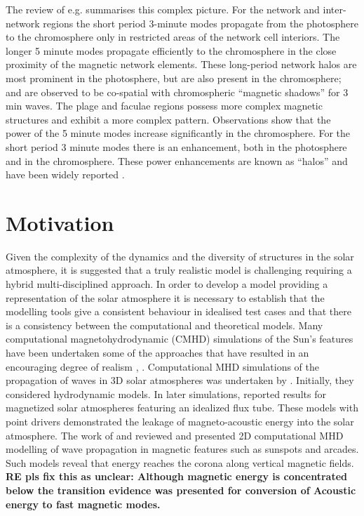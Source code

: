 \documentclass{aastex62}
\begin{document}

The review of e.g. \citet{Khomenko2013} summarises this complex picture. For the network and inter-network regions the short period 3-minute modes propagate from the photosphere to the chromosphere only in restricted areas of the network cell interiors. The longer 5 minute modes propagate efficiently to the chromosphere in the close proximity of the magnetic network elements. These long-period network halos are most prominent in the photosphere, but are also present in the chromosphere; and are observed to be co-spatial with chromospheric “magnetic shadows” for 3 min waves. The plage and faculae regions possess more complex magnetic structures and exhibit a more complex pattern.  Observations show that the power of the 5 minute modes increase significantly in the chromosphere. For the short period  3 minute modes there is an enhancement, both in the photosphere and in the chromosphere. These power enhancements are known as “halos” and have been widely reported \cite{Kontogiannis2010}. 

\section{Motivation} \label{sec:motivation}

Given the complexity of the dynamics and the diversity of structures in the solar atmosphere, it is suggested that a truly realistic model is challenging requiring a hybrid multi-disciplined approach. In order to develop a model providing a representation of the solar atmosphere it is necessary to establish that the modelling tools give a consistent behaviour in idealised test cases and that there is a consistency between the computational and theoretical models. Many computational magnetohydrodynamic (CMHD) simulations of the Sun's features  have been undertaken some of the approaches that have resulted in an encouraging degree of realism  \citet{Vogler2005}, \citet{Gudiksen2011}. Computational MHD simulations of the propagation of waves in 3D solar atmospheres was undertaken by \citet{Fedun2009}. Initially, they considered hydrodynamic models. In later simulations, \citet{Fedun2011} \citet{Vigeesh2012} reported results for magnetized solar atmospheres featuring an idealized flux tube. These models with point drivers demonstrated the leakage of magneto-acoustic energy into the solar atmosphere. The work of \citet{Khomenko2013} and  \citet{Santamaria2015} reviewed and presented 2D computational MHD modelling of wave propagation in magnetic features such as sunspots and arcades. Such models reveal that energy reaches the corona along vertical magnetic fields. {\bf RE pls fix this as unclear: Although magnetic energy is concentrated below the transition evidence was presented for conversion of Acoustic energy to fast magnetic modes.}
\end{document}
